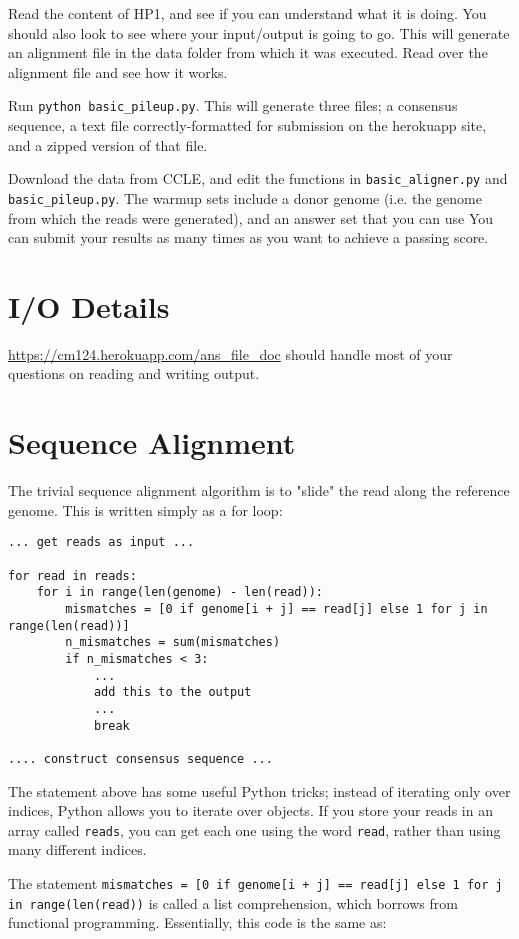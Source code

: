 \documentclass{article}
\begin{document}
Read the content of HP1, and see if you can understand what it is doing. You should also look to see where your input/output is going to go. This will generate an alignment file in the data folder from which it was executed. Read over the alignment file and see how it works.

Run \verb|python basic_pileup.py|. This will generate three files; a consensus sequence, a text file correctly-formatted for submission on the herokuapp site, and a zipped version of that file.

Download the data from CCLE, and edit the functions in \verb|basic_aligner.py| and 
\verb|basic_pileup.py|. The warmup sets include a donor genome (i.e. the genome from which the reads were generated), and an answer set that you can use 
You can submit your results as many times as you want to achieve a passing score.

\section*{I/O Details}
\url{https://cm124.herokuapp.com/ans_file_doc} should handle most of your questions on reading and writing output.

\section*{Sequence Alignment}
The trivial sequence alignment algorithm is to "slide" the read along the reference genome. This is written simply as a for loop:

\begin{verbatim}
... get reads as input ...

for read in reads:
    for i in range(len(genome) - len(read)):
	    mismatches = [0 if genome[i + j] == read[j] else 1 for j in range(len(read))]
	    n_mismatches = sum(mismatches)
	    if n_mismatches < 3:
		    ...
		    add this to the output
		    ...
		    break
		    
.... construct consensus sequence ...
\end{verbatim}

The statement above has some useful Python tricks; instead of iterating only over indices, Python allows you to iterate over objects. If you store your reads in an array called \verb!reads!, you can get each one using the word \verb!read!, rather than using many different indices.

The statement \verb~mismatches = [0 if genome[i + j] == read[j] else 1 for j in range(len(read))~ is called a list comprehension, which borrows from functional programming. Essentially, this code is the same as:
\end{document}
